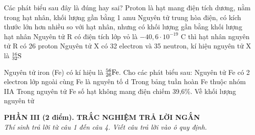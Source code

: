 \documentclass[11pt,a4paper]{article}
\begin{document}
\begin{ex}
Các phát biểu sau đây là đúng hay sai?
\choiceTF
{\True Proton là hạt mang điện tích dương, nằm trong hạt nhân, khối lượng gần bằng 1 amu}
{\True Nguyên tử trung hòa điện, có kích thước lớn hơn nhiều so với hạt nhân, nhưng có khối lượng gần bằng khối lượng hạt nhân}
{Nguyên tử R có điện tích lớp vỏ là $-40,6\cdot 10^{-19}\text{ C}$ thì hạt nhân nguyên tử R có 26 proton}
{Nguyên tử X có 32 electron và 35 neutron, kí hiệu nguyên tử X là $^{16}_{32}\ce{S}$}

\end{ex}
\begin{ex}
Nguyên tử iron (Fe) có kí hiệu là $^{56}_{26}\ce{Fe}$. Cho các phát biểu sau:
\choiceTF
{\True Nguyên tử Fe có 2 electron lớp ngoài cùng}
{\True Fe là nguyên tố d}
{Trong bảng tuần hoàn Fe thuộc nhóm IIA}
{Trong nguyên tử Fe số hạt không mang điện chiếm 39,6\%. Về khối lượng nguyên tử}

\end{ex}
\vspace{4pt}
\noindent
{\color{mainGreen}\textbf{\large PHẦN III (2 điểm). TRẮC NGHIỆM TRẢ LỜI NGẮN}}\\
\textit{\small Thí sinh trả lời từ câu 1 đến câu 4. Viết câu trả lời vào ô quy định.}
\vspace{2pt}
\end{document}
